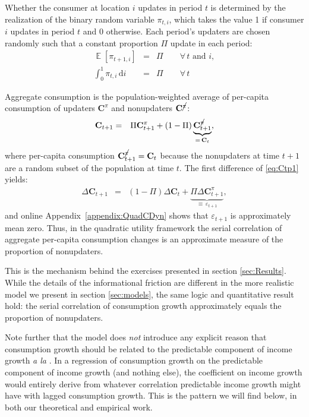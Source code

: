 \documentclass[titlepage]{article}
\DeclareMathOperator{\Ex}{\mathbb{E}} %
\begin{document}
Whether the consumer at location $i$ updates in period $t$ is determined by the realization of the binary random variable $\pi_{t,i}$, which takes the value 1 if consumer $i$ updates in period $t$ and 0 otherwise.  Each period's updaters are chosen randomly such that a constant proportion $\Pi$ update in each period:
\begin{eqnarray*}
   \Ex[\pi_{t+1,i}] &= & \Pi \qquad \forall\,t \text{ and } i,
\\ \int_{0}^{1} \pi_{t,i}\,\text{d}i & = & \Pi \qquad \forall\,t
\end{eqnarray*}

Aggregate consumption is the population-weighted average of per-capita consumption of updaters $\mathbf{C}^{\pi}$ and nonupdaters $\mathbf{C}^{\cancel{\pi}}$:
\begin{eqnarray}
 \mathbf{C}_{t+1} & = & \Pi \mathbf{C}^{{\pi}}_{t+1}+(1-\Pi) \underbrace{\mathbf{C}^{\cancel{{\pi}}}_{t+1}}_{=\,\mathbf{C}_{t}}, \label{eq:Ctp1}
\end{eqnarray}
where per-capita consumption $\mathbf{C}^{\cancel{{\pi}}}_{t+1}=\mathbf{C}_{t}$ because the
nonupdaters at time $t+1$ are a random subset of the population at time $t$.
The first difference of \eqref{eq:Ctp1} yields:
\begin{eqnarray*}
  \Delta \mathbf{C}_{t+1} & = &  (1-\Pi) \Delta \mathbf{C}_{t} + \underbrace{\Pi \Delta \mathbf{C}^{{\pi}}_{t+1}}_{\equiv\,\varepsilon_{t+1}}, \label{eq:deltac} \label{eq:dCQuadStickyApprox}
\end{eqnarray*}
and online Appendix~\ref{appendix:QuadCDyn} shows that $\varepsilon_{t+1}$ is approximately mean zero. Thus, in the quadratic utility framework the serial correlation of aggregate per-capita consumption changes is an approximate measure of the proportion of nonupdaters.

This is the mechanism behind the exercises presented in section \ref{sec:Results}.  While the details of the informational friction are different in the more realistic model we present in section \ref{sec:models}, the same logic and quantitative result hold: the serial correlation of consumption growth approximately equals the proportion of nonupdaters.

Note further that the model does {\it not} introduce any explicit reason that consumption growth should be related to the predictable component of income growth {\it a la} \cite{cmModel}.  In a regression of consumption growth on the predictable component of income growth (and nothing else), the coefficient on income growth would entirely derive from whatever correlation predictable income growth might have with lagged consumption growth.  This is the pattern we will find below, in both our theoretical and empirical work.
\end{document}
